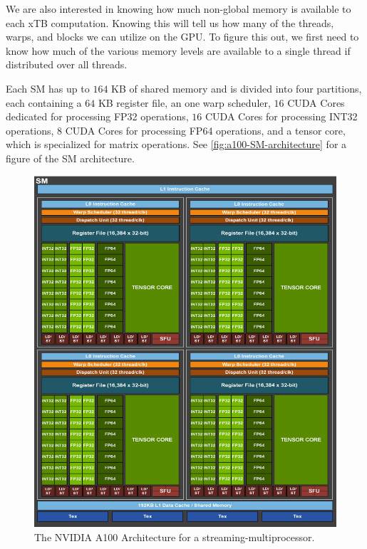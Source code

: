 We are also interested in knowing how much non-global memory is available to each xTB computation. Knowing this will tell us how many of the threads, warps, and blocks we can utilize on the GPU. To figure this out, we first need to know how much of the various memory levels are available to a single thread if distributed over all threads.

Each SM has up to $164$ KB of shared memory and is divided into four partitions, each containing a $64$ KB register file, an one warp scheduler, $16$ CUDA Cores dedicated for processing FP32 operations, $16$ CUDA Cores for processing INT32 operations, $8$ CUDA Cores for processing FP64 operations, and a tensor core, which is specialized for matrix operations. See \autoref{fig:a100-SM-architecture} for a figure of the SM architecture.

\begin{figure}[H]
\centering
\includegraphics[scale=0.3]{images/nvidia-a100-architecture}
\caption{The NVIDIA A100 Architecture for a streaming-multiprocessor. \cite[Figure 5]{nvidia-a100-architecture}}
\label{fig:a100-SM-architecture}
\end{figure}


